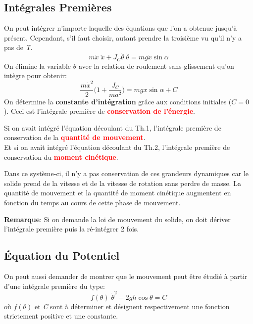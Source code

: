 \documentclass[a4paper]{article}
\begin{document}
\subsection{Intégrales Premières}





On peut intégrer n'importe laquelle des équations que l'on a obtenue jusqu'à présent. Cependant, s'il faut choisir, autant prendre la troisième vu qu'il n'y a pas de \emph{T}.
\begin{equation}
m \dot{x} \; \ddot{x} + J_C \dot{\theta} \; \ddot{\theta} = m g \dot{x} \sin \alpha \tag{Th.3}
\end{equation}
On élimine la variable $ \theta $ avec la relation de roulement sans-glissement qu'on intègre pour obtenir:
\[ \frac{m \dot{x}^2}{2} \bigg( 1 + \frac{J_C}{m a^2} \bigg) = m g x \sin \alpha + C \]
On détermine la \textbf{constante d'intégration} grâce aux conditions initiales ($ C = 0 $). Ceci est l'intégrale première de \textcolor{red}{\textbf{conservation de l'énergie}}.

Si on avait intégré l'équation découlant du Th.1, l'intégrale première de conservation de la \textcolor{red}{\textbf{quantité de mouvement}}. \\
Et si on avait intégré l'équation découlant du Th.2, l'intégrale première de conservation du \textcolor{red}{\textbf{moment cinétique}}.

Dans ce système-ci, il n'y a pas conservation de ces grandeurs dynamiques car le solide prend de la vitesse et de la vitesse de rotation sans perdre de masse. La quantité de mouvement et la quantité de moment cinétique augmentent en fonction du temps au cours de cette phase de mouvement.

\textbf{Remarque}: Si on demande la loi de mouvement du solide, on doit dériver l'intégrale première puis la ré-intégrer 2 fois.





\subsection{Équation du Potentiel}





On peut aussi demander de montrer que le mouvement peut être étudié à partir d’une intégrale première du type: 
\[ f(\theta) \; \dot{\theta}^2 - 2 g h \cos \theta = C \]
où $ f(\theta) $ et \emph{C} sont à déterminer et désignent respectivement une fonction strictement positive et une constante.
\end{document}
